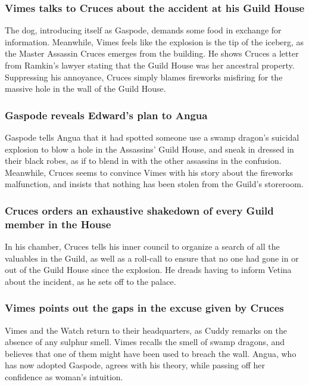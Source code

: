 \subsubsection{\Gls{Vimes} talks to \Gls{Cruces} about the accident at his Guild House}
The dog, introducing itself as \Gls{Gaspode}, demands some food in exchange for information.
Meanwhile, \Gls{Vimes} feels like the explosion is the tip of the iceberg, as the Master Assassin
\Gls{Cruces} emerges from the building. He shows \Gls{Cruces} a letter from \Gls{Ramkin}'s lawyer
stating that the Guild House was her ancestral property. Suppressing his annoyance, \Gls{Cruces}
simply blames fireworks misfiring for the massive hole in the wall of the Guild House.

\subsubsection{\Gls{Gaspode} reveals \Gls{Edward}'s plan to \Gls{Angua}}
\Gls{Gaspode} tells \Gls{Angua} that it had spotted someone use a swamp dragon's suicidal explosion
to blow a hole in the Assassins' Guild House, and sneak in dressed in their black robes, as if to
blend in with the other assassins in the confusion. Meanwhile, \Gls{Cruces} seems to convince
\Gls{Vimes} with his story about the fireworks malfunction, and insists that nothing has been stolen
from the Guild's storeroom.

\subsubsection{\Gls{Cruces} orders an exhaustive shakedown of every Guild member in the House}
In his chamber, \Gls{Cruces} tells his inner council to organize a search of all the valuables in
the Guild, as well as a roll-call to ensure that no one had gone in or out of the Guild House since
the explosion. He dreads having to inform \Gls{Vetina} about the incident, as he sets off to the
palace.

\subsubsection{\Gls{Vimes} points out the gaps in the excuse given by \Gls{Cruces}}
\Gls{Vimes} and the Watch return to their headquarters, as \Gls{Cuddy} remarks on the absence of
any sulphur smell. \Gls{Vimes} recalls the smell of swamp dragons, and believes that one of them
might have been used to breach the wall. \Gls{Angua}, who has now adopted \Gls{Gaspode}, agrees with
his theory, while passing off her confidence as woman's intuition.

